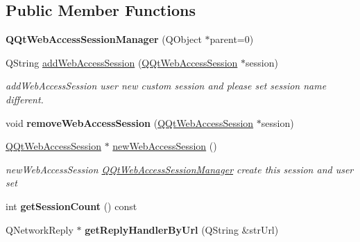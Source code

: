 \subsection*{Public Member Functions}
\begin{DoxyCompactItemize}
\item 
\mbox{\label{class_q_qt_web_access_session_manager_a08f490e05831aae3b7bd04342ceee19c}} 
{\bfseries Q\+Qt\+Web\+Access\+Session\+Manager} (Q\+Object $\ast$parent=0)
\item 
Q\+String \mbox{\hyperlink{class_q_qt_web_access_session_manager_a5dd2bdd2a8f26690615a6a0a9523411f}{add\+Web\+Access\+Session}} (\mbox{\hyperlink{class_q_qt_web_access_session}{Q\+Qt\+Web\+Access\+Session}} $\ast$session)
\begin{DoxyCompactList}\small\item\em add\+Web\+Access\+Session user new custom session and please set session name different. \end{DoxyCompactList}\item 
\mbox{\label{class_q_qt_web_access_session_manager_ad09d375d9d606753ce9829536c3e34e6}} 
void {\bfseries remove\+Web\+Access\+Session} (\mbox{\hyperlink{class_q_qt_web_access_session}{Q\+Qt\+Web\+Access\+Session}} $\ast$session)
\item 
\mbox{\hyperlink{class_q_qt_web_access_session}{Q\+Qt\+Web\+Access\+Session}} $\ast$ \mbox{\hyperlink{class_q_qt_web_access_session_manager_a01352e16e60301a51d88b5c408b33e37}{new\+Web\+Access\+Session}} ()
\begin{DoxyCompactList}\small\item\em new\+Web\+Access\+Session \mbox{\hyperlink{class_q_qt_web_access_session_manager}{Q\+Qt\+Web\+Access\+Session\+Manager}} create this session and user set \end{DoxyCompactList}\item 
\mbox{\label{class_q_qt_web_access_session_manager_a92054a6577720463dae95dda55a6f688}} 
int {\bfseries get\+Session\+Count} () const
\item 
\mbox{\label{class_q_qt_web_access_session_manager_a4bda11a9956556fee5fe1e7b00938444}} 
Q\+Network\+Reply $\ast$ {\bfseries get\+Reply\+Handler\+By\+Url} (Q\+String \&str\+Url)

\end{DoxyCompactItemize}
